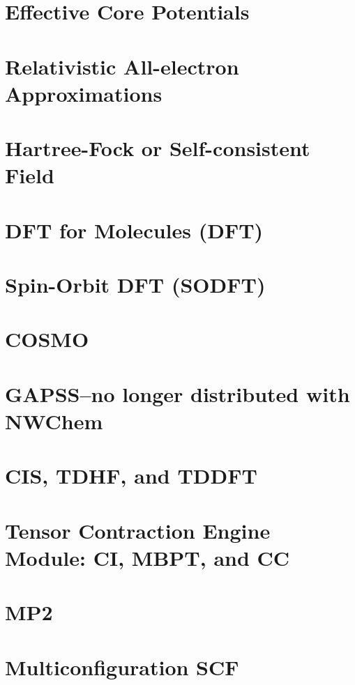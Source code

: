 \chapter{Effective Core Potentials}


\chapter{Relativistic All-electron Approximations}


\chapter{Hartree-Fock or Self-consistent Field} 


\chapter{DFT for Molecules (DFT)}


\chapter{Spin-Orbit DFT (SODFT)}


\chapter{COSMO}


\chapter{GAPSS--no longer distributed with NWChem}


\chapter{CIS, TDHF, and TDDFT}


\chapter{Tensor Contraction Engine Module: CI, MBPT, and CC}


\chapter{MP2}


\chapter{Multiconfiguration SCF}


